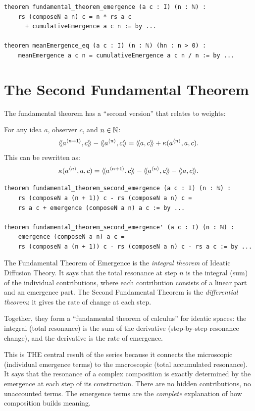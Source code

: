 \begin{lstlisting}[caption={The Fundamental Theorem (IDT\_v3\_Emergence.lean)}]
theorem fundamental_theorem_emergence (a c : I) (n : ℕ) :
    rs (composeN a n) c = n * rs a c
      + cumulativeEmergence a c n := by ...

theorem meanEmergence_eq (a c : I) (n : ℕ) (hn : n > 0) :
    meanEmergence a c n = cumulativeEmergence a c n / n := by ...
\end{lstlisting}


\section{The Second Fundamental Theorem}

The fundamental theorem has a ``second version'' that relates to weights:

\begin{theorem}
\label{thm:fundamental-second}
For any idea $a$, observer $c$, and $n \in \mathbb{N}$:
\[
  \langle\!\langle a^{\langle n+1 \rangle}, c \rangle\!\rangle - \langle\!\langle a^{\langle n \rangle}, c \rangle\!\rangle = \langle\!\langle a, c \rangle\!\rangle + \kappa(a^{\langle n \rangle}, a, c).
\]
This can be rewritten as:
\[
  \kappa(a^{\langle n \rangle}, a, c) = \langle\!\langle a^{\langle n+1 \rangle}, c \rangle\!\rangle - \langle\!\langle a^{\langle n \rangle}, c \rangle\!\rangle - \langle\!\langle a, c \rangle\!\rangle.
\]
\end{theorem}

\begin{lstlisting}[caption={Second Fundamental Theorem (IDT\_v3\_Emergence.lean)}]
theorem fundamental_theorem_second_emergence (a c : I) (n : ℕ) :
    rs (composeN a (n + 1)) c - rs (composeN a n) c =
    rs a c + emergence (composeN a n) a c := by ...

theorem fundamental_theorem_second_emergence' (a c : I) (n : ℕ) :
    emergence (composeN a n) a c =
    rs (composeN a (n + 1)) c - rs (composeN a n) c - rs a c := by ...
\end{lstlisting}

\begin{interpretation}
The Fundamental Theorem of Emergence is the \emph{integral theorem} of Ideatic
Diffusion Theory. It says that the total resonance at step $n$ is the integral
(sum) of the individual contributions, where each contribution consists of a
linear part and an emergence part. The Second Fundamental Theorem is the
\emph{differential theorem}: it gives the rate of change at each step.

Together, they form a ``fundamental theorem of calculus'' for ideatic spaces:
the integral (total resonance) is the sum of the derivative (step-by-step
resonance change), and the derivative is the rate of emergence.

This is THE central result of the series because it connects the microscopic
(individual emergence terms) to the macroscopic (total accumulated resonance).
It says that the resonance of a complex composition is exactly determined by the
emergence at each step of its construction. There are no hidden contributions,
no unaccounted terms. The emergence terms are the \emph{complete} explanation of
how composition builds meaning.
\end{interpretation}


